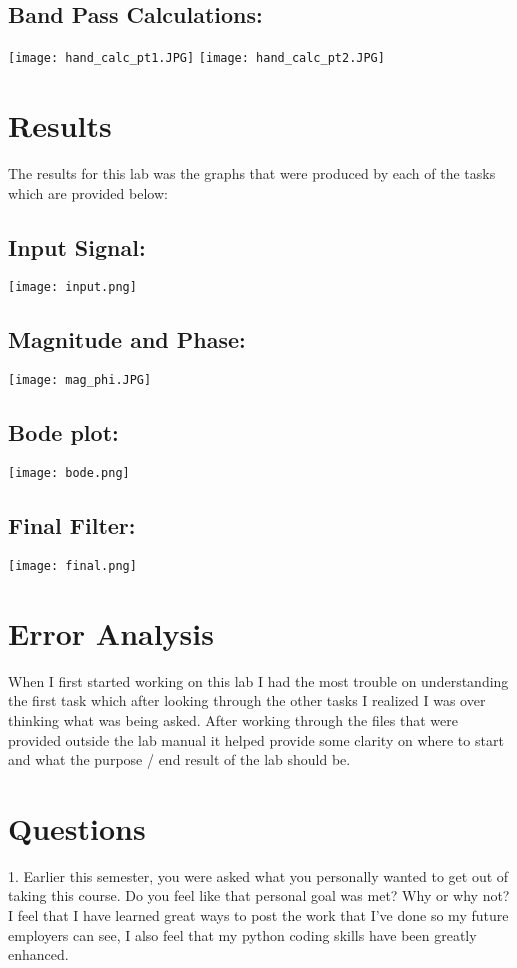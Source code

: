 \documentclass[12pt]{report}
\begin{document}
\subsection{Band Pass Calculations:}
\texttt{[image: hand\_calc\_pt1.JPG]}
\texttt{[image: hand\_calc\_pt2.JPG]}

\section{Results}
The results for this lab was the graphs that were produced by each of the tasks which are provided below:

\subsection{Input Signal:}
\texttt{[image: input.png]}

\subsection{Magnitude and Phase:}
\texttt{[image: mag\_phi.JPG]}

\subsection{Bode plot:}
\texttt{[image: bode.png]}

\subsection{Final Filter:}
\texttt{[image: final.png]}

\section{Error Analysis}

When I first started working on this lab I had the most trouble on understanding the first task which after looking 
through the other tasks I realized I was over thinking what was being asked. After working through the files that were provided outside the lab manual it helped provide some clarity on where to start and what the purpose / end result of the lab should be. 

\section{Questions}

1. Earlier this semester, you were asked what you personally wanted to get out of taking this
course. Do you feel like that personal goal was met? Why or why not?
I feel that I have learned great ways to post the work that I've done so my future employers can see, 
I also feel that my python coding skills have been greatly enhanced. 
\end{document}
